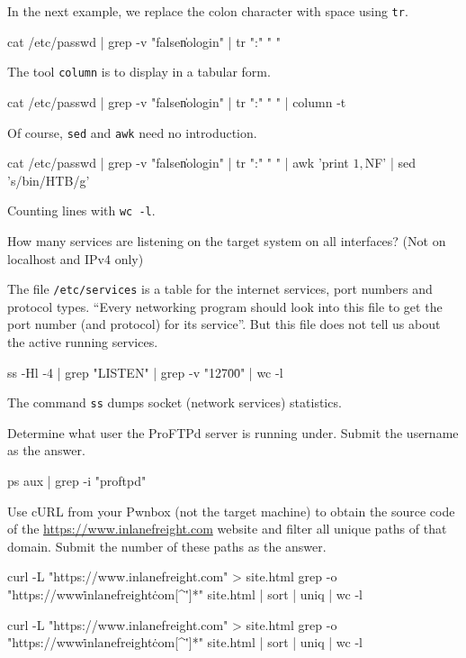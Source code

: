 \documentclass[a4paper,12pt]{article}
\newcommand{\bashinline}[1]{\texttt{#1}}
\begin{document}
In the next example, we replace the colon character with space using \bashinline{tr}.
\begin{bash}
cat /etc/passwd | grep -v "false\|nologin" | tr ":" " "
\end{bash}

The tool \bashinline{column} is to display in a tabular form.
\begin{bash}
cat /etc/passwd | grep -v "false\|nologin" | tr ":" " " | column -t
\end{bash}

Of course, \bashinline{sed} and \bashinline{awk} need no introduction.
\begin{bash}
cat /etc/passwd | grep -v "false\|nologin" | tr ":" " " |
awk '{print $1, $NF}' | sed 's/bin/HTB/g'
\end{bash}

Counting lines with \bashinline{wc -l}.

\n

How many services are listening on the target system on all interfaces? (Not on localhost and IPv4 only)

The file \bashinline{/etc/services} is a table for the internet services, port numbers and protocol types. ``Every networking program should look into this file to get the port number (and protocol) for its service''. But this file does not tell us about the active running services.
\begin{bash}
ss -Hl -4 | grep "LISTEN" | grep -v "127\.0\.0" | wc -l
\end{bash}

The command \bashinline{ss} dumps socket (network services) statistics.

\n

Determine what user the ProFTPd server is running under. Submit the username as the answer.
\begin{bash}
ps aux | grep -i "proftpd"
\end{bash}

\n

Use cURL from your Pwnbox (not the target machine) to obtain the source code of the \url{https://www.inlanefreight.com} website and filter all unique paths of that domain. Submit the number of these paths as the answer.
\begin{bash}
curl -L "https://www.inlanefreight.com" > site.html
grep -o "https\?://www\.inlanefreight\.com[^\"']*" site.html |
sort | uniq | wc -l
\end{bash}

\begin{bash}
curl -L "https://www.inlanefreight.com" > site.html
grep -o "https\?://www\.inlanefreight\.com[^\"']*" site.html |
sort | uniq | wc -l
\end{bash}
\end{document}
